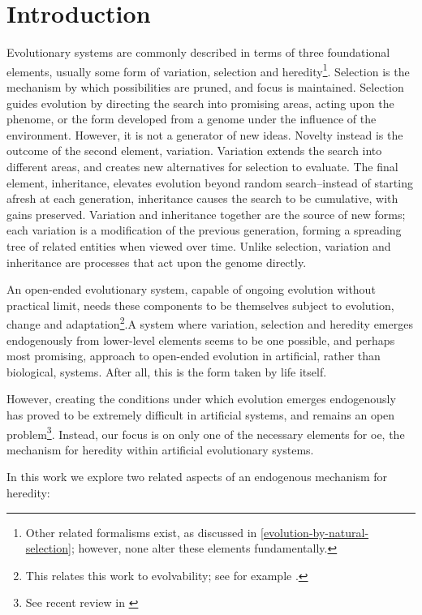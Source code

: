 \chapter{Introduction}

Evolutionary systems are commonly described in terms of three foundational elements, usually some form of variation, selection and heredity\footnote{Other related formalisms exist, as discussed in  \cref{evolution-by-natural-selection}; however, none alter these elements fundamentally.}. Selection is the mechanism by which possibilities are pruned, and focus is maintained. Selection guides evolution by directing the search into promising areas, acting upon the phenome, or the form developed from a genome under the influence of the environment. However, it is not a generator of new ideas. Novelty instead is the outcome of the second element, variation. Variation extends the search into different areas, and creates new alternatives for selection to evaluate. The final element, inheritance, elevates evolution beyond random search--instead of starting afresh at each generation, inheritance causes the search to be cumulative, with gains preserved. Variation and inheritance together are the source of new forms; each variation is a modification of the previous generation, forming a spreading tree of related entities when viewed over time. Unlike selection, variation and inheritance are processes that act upon the genome directly.

An open-ended evolutionary system, capable of ongoing evolution without practical limit, needs these components to be themselves subject to evolution, change and adaptation\footnote{This relates this work to evolvability; see for example \textcite{Pigliucci2008,Wagner:1996kc,Wagner:2008mi}.}.A system where variation, selection and heredity emerges endogenously from lower-level elements seems to be one possible, and perhaps most promising, approach to open-ended evolution in artificial, rather than biological, systems. After all, this is the form taken by life itself.

However, creating the conditions under which evolution emerges endogenously has proved to be extremely difficult in artificial systems, and remains an open problem\footnote{See recent review in \cite{BanzhafBaumgaertnerBeslonEtAl2016}}. Instead, our focus is on only one of the necessary elements for \gls{oe}, the mechanism for heredity within artificial evolutionary systems.

In this work we explore two related aspects of an endogenous mechanism for heredity:

